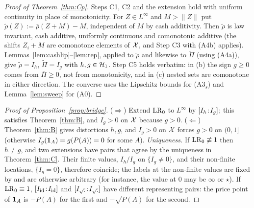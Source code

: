 \begin{proof}[Proof of Theorem~\ref{thm:Cp}]
Steps C1, C2 and the extension hold with uniform continuity in place of monotonicity. For $Z\in L^\infty$ and
$M>\|Z\|$ put $\tilde\rho(Z):=\bar\rho(Z+M)-M$, independent of $M$ by cash additivity. Then $\tilde\rho$ is law
invariant, cash additive, uniformly continuous and comonotonic additive (the shifts $Z_i+M$ are comonotone elements
of $\mathcal X$, and Step C3 with (A4b) applies). Lemmas~\ref{lem:cashlip}--\ref{lem:rep}, applied to $\tilde\rho$ and
likewise to $\tilde\Pi$ (using (A4a)), give $\tilde\rho=I_h$, $\tilde\Pi=I_g$ with $h,g\in\mathcal H_1$. Step C5 holds
verbatim: in (b) the sign $g\ge0$ comes from $\bar\Pi\ge0$, not from monotonicity, and in (c) nested sets are
comonotone in either direction. The converse uses the Lipschitz bounds for (A3$_s$) and Lemma~\ref{lem:sweep} for
(A0). \qedhere
\end{proof}

\begin{proof}[Proof of Proposition~\ref{prop:bridge}]
($\Rightarrow$) Extend $\mathrm{LR}_0$ to $L^\infty$ by $[I_h\!:\!I_g]$; this satisfies Theorem~\ref{thm:B}, and
$I_g>0$ on $\mathcal X$ because $g>0$. ($\Leftarrow$) Theorem~\ref{thm:B} gives distortions $h,g$, and $I_g>0$ on $\mathcal X$
forces $g>0$ on $(0,1]$ (otherwise $I_g(\mathbf 1_A)=g(P(A))=0$ for some $A$). \emph{Uniqueness.} If $\mathrm{LR}_0\not\equiv1$ then
$h\ne g$, and two extensions have pairs that agree by the uniqueness in Theorem~\ref{thm:C}. Their finite values,
$I_h/I_g$ on $\{I_g\ne0\}$, and their non-finite locations, $\{I_g=0\}$, therefore coincide; the labels at the
non-finite values are fixed by  and are otherwise arbitrary (for instance, the value at $0$ may be $\infty$ or
$\star$). If $\mathrm{LR}_0\equiv1$, $[I_{\mathrm{id}}\!:\!I_{\mathrm{id}}]$ and $[I_{\sqrt\cdot}\!:\!I_{\sqrt\cdot}]$ have
different representing pairs: the price point of $\mathbf 1_A$ is $-P(A)$ for the first and $-\sqrt{P(A)}$ for the second. \qedhere
\end{proof}
